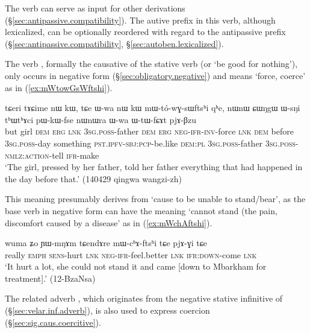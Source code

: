 The verb  can serve as input for other derivations (§\ref{sec:antipassive.compatibility}). The autive prefix  in this verb, although lexicalized, can be optionally reordered with regard to the antipassive prefix (§\ref{sec:antipassive.compatibility}, §\ref{sec:autoben.lexicalized}).

The verb , formally the causative of the stative verb  (or `be good for nothing'), only occurs in negative form (§\ref{sec:obligatory.negative}) and means `force, coerce' as in (\ref{ex:mWtowGsWftshi}).

\begin{exe}
\ex \label{ex:mWtowGsWftshi}
 \gll   tɕeri tɤɕime nɯ kɯ, tɕe ɯ-wa nɯ kɯ mɯ-tó-wɣ-sɯftsʰi qʰe, nɯnɯ ɕɯŋgɯ ɯ-sŋi tʰɯtʰɤci pɯ-kɯ-fse nɯnɯra ɯ-wa ɯ-tɯ-fɕɤt pjɤ-βzu \\
 but girl \textsc{dem} \textsc{erg} \textsc{lnk} \textsc{3sg}.\textsc{poss}-father \textsc{dem} \textsc{erg} \textsc{neg}-\textsc{ifr}-\textsc{inv}-force \textsc{lnk} \textsc{dem} before \textsc{3sg}.\textsc{poss}-day something \textsc{pst}.\textsc{ipfv}-\textsc{sbj}:\textsc{pcp}-be.like \textsc{dem}:\textsc{pl} \textsc{3sg}.\textsc{poss}-father \textsc{3sg}.\textsc{poss}-\textsc{nmlz}:\textsc{action}-tell \textsc{ifr}-make \\
\glt `The girl, pressed by her father, told her father everything that had happened in the day before that.' (140429 qingwa wangzi-zh)
\end{exe}

This meaning presumably derives from `cause to be unable to stand/bear', as the base verb  in negative form can have the meaning `cannot stand (the pain, discomfort caused by a disease' as in (\ref{ex:mWchAftshi}).

\begin{exe}
\ex \label{ex:mWchAftshi}
 \gll wuma ʑo ɲɯ-mŋɤm tɕendɤre mɯ-cʰɤ-ftsʰi tɕe pjɤ-ɣi tɕe \\
 really \textsc{emph} \textsc{sens}-hurt \textsc{lnk} \textsc{neg}-\textsc{ifr}-feel.better \textsc{lnk} \textsc{ifr}:\textsc{down}-come \textsc{lnk} \\
\glt `It hurt a lot, she could not stand it and came [down to Mbarkham for treatment].' (12-BzaNsa)
\end{exe}

The related adverb , which originates from the negative stative infinitive of  (§\ref{sec:velar.inf.adverb}), is also used to express coercion (§\ref{sec:sig.caus.coercitive}).

